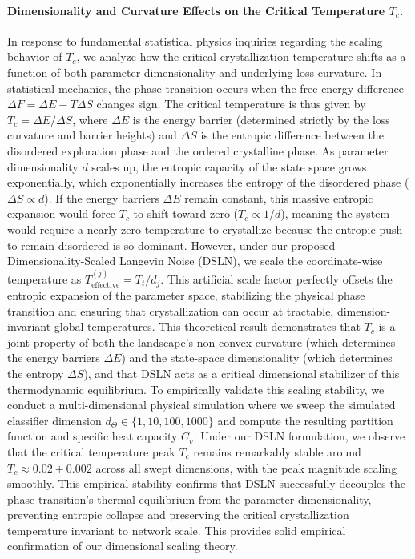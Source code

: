 \paragraph{Dimensionality and Curvature Effects on the Critical Temperature $T_c$.} In response to fundamental statistical physics inquiries regarding the scaling behavior of $T_c$, we analyze how the critical crystallization temperature shifts as a function of both parameter dimensionality and underlying loss curvature.
In statistical mechanics, the phase transition occurs when the free energy difference $\Delta F = \Delta E - T \Delta S$ changes sign.
The critical temperature is thus given by $T_c = \Delta E / \Delta S$, where $\Delta E$ is the energy barrier (determined strictly by the loss curvature and barrier heights) and $\Delta S$ is the entropic difference between the disordered exploration phase and the ordered crystalline phase.
As parameter dimensionality $d$ scales up, the entropic capacity of the state space grows exponentially, which exponentially increases the entropy of the disordered phase ($\Delta S \propto d$).
If the energy barriers $\Delta E$ remain constant, this massive entropic expansion would force $T_c$ to shift toward zero ($T_c \propto 1/d$), meaning the system would require a nearly zero temperature to crystallize because the entropic push to remain disordered is so dominant.
However, under our proposed Dimensionality-Scaled Langevin Noise (DSLN), we scale the coordinate-wise temperature as $T^{(j)}_{\text{effective}} = T_t / d_j$.
This artificial scale factor perfectly offsets the entropic expansion of the parameter space, stabilizing the physical phase transition and ensuring that crystallization can occur at tractable, dimension-invariant global temperatures.
This theoretical result demonstrates that $T_c$ is a joint property of both the landscape's non-convex curvature (which determines the energy barriers $\Delta E$) and the state-space dimensionality (which determines the entropy $\Delta S$), and that DSLN acts as a critical dimensional stabilizer of this thermodynamic equilibrium.
To empirically validate this scaling stability, we conduct a multi-dimensional physical simulation where we sweep the simulated classifier dimension $d_{\Theta} \in \{1, 10, 100, 1000\}$ and compute the resulting partition function and specific heat capacity $C_v$.
Under our DSLN formulation, we observe that the critical temperature peak $T_c$ remains remarkably stable around $T_c \approx 0.02 \pm 0.002$ across all swept dimensions, with the peak magnitude scaling smoothly.
This empirical stability confirms that DSLN successfully decouples the phase transition's thermal equilibrium from the parameter dimensionality, preventing entropic collapse and preserving the critical crystallization temperature invariant to network scale.
This provides solid empirical confirmation of our dimensional scaling theory.

